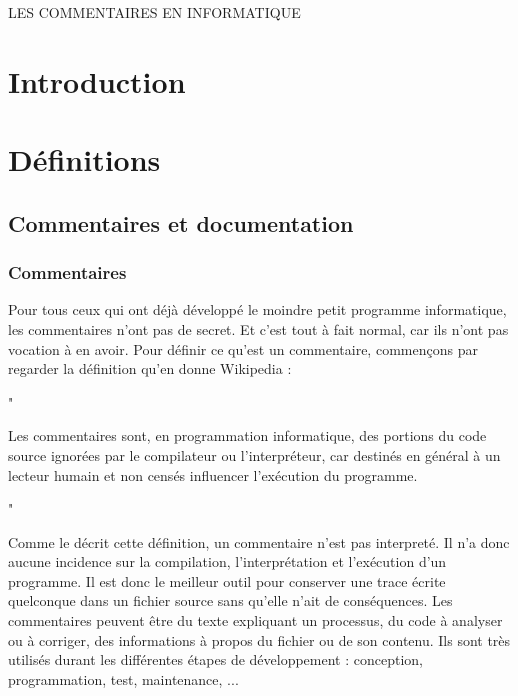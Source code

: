 \documentclass[10pt,a4paper,twoside, openany]{report}
\begin{document}
\begin{titlepage}
\begin{LARGE}
LES COMMENTAIRES EN INFORMATIQUE
\end{LARGE}
\end{titlepage}

\chapter*{Introduction}

\paragraph{}

\chapter{D\'efinitions}

\section{Commentaires et documentation}

\subsection{Commentaires}

Pour tous ceux qui ont d\'ej\`a d\'evelopp\'e le moindre petit programme informatique, les commentaires n'ont pas de secret. Et c'est tout \`a fait normal, car ils n'ont pas vocation \`a en avoir. Pour d\'efinir ce qu'est un commentaire, commen\c cons par regarder la d\'efinition qu'en donne Wikipedia :

\begin{quoting}
\begin{large}"\end{large}
Les commentaires sont, en programmation informatique, des portions du code source ignor\'ees par le compilateur ou l'interpr\'eteur, car destin\'es en g\'en\'eral \`a un lecteur humain et non cens\'es influencer l'ex\'ecution du programme.
\begin{large}"\end{large}
\end{quoting}

Comme le d\'ecrit cette d\'efinition, un commentaire n'est pas interpret\'e. Il n'a donc aucune incidence sur la compilation, l'interpr\'etation et l'ex\'ecution d'un programme. Il est donc le meilleur outil pour conserver une trace \'ecrite quelconque dans un fichier source sans qu'elle n'ait de cons\'equences. Les commentaires peuvent \^etre du texte expliquant un processus, du code \`a analyser ou \`a corriger, des informations \`a propos du fichier ou de son contenu. Ils sont tr\`es utilis\'es durant les diff\'erentes \'etapes de d\'eveloppement : conception, programmation, test, maintenance, ...\newline
\end{document}

